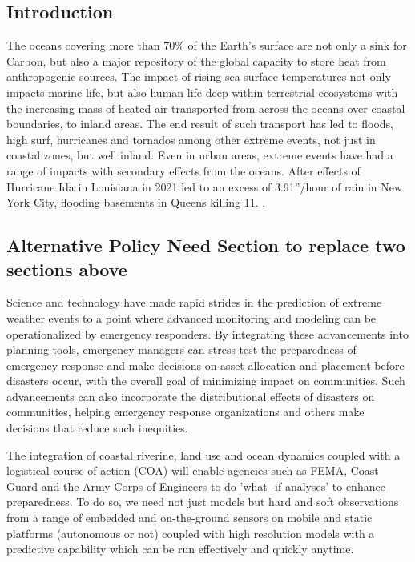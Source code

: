\subsection*{Introduction}

The oceans covering more than 70\% of the Earth's surface are not only
a sink for Carbon, but also a major repository of the global capacity
to store heat from anthropogenic sources. The impact of rising sea
surface temperatures not only impacts marine life, but also human life
deep within terrestrial ecosystems with the increasing mass of heated
air transported from across the oceans over coastal boundaries, to
inland areas. The end result of such transport has led to floods, high
surf, hurricanes and tornados among other extreme events, not just in
coastal zones, but well inland. Even in urban areas, extreme events
have had a range of impacts with secondary effects from the
oceans. After effects of Hurricane Ida in Louisiana in 2021 led to an
excess of 3.91''/hour of rain in New York City, flooding basements in
Queens killing 11. .

\subsection{Alternative Policy Need Section to replace two sections
  above}

Science and technology have made rapid strides in the prediction of
extreme weather events to a point where advanced monitoring and
modeling can be operationalized by emergency responders. By
integrating these advancements into planning tools, emergency managers
can stress-test the preparedness of emergency response and make
decisions on asset allocation and placement before disasters occur,
with the overall goal of minimizing impact on communities. Such
advancements can also incorporate the distributional effects of
disasters on communities, helping emergency response organizations and
others make decisions that reduce such inequities.


The integration of coastal riverine, land use and ocean dynamics
coupled with a logistical course of action (COA) will enable agencies
such as FEMA, Coast Guard and the Army Corps of Engineers to do ’what-
if-analyses’ to enhance preparedness. To do so, we need not just
models but hard and soft observations from a range of embedded and
on-the-ground sensors on mobile and static platforms (autonomous or
not) coupled with high resolution models with a predictive capability
which can be run effectively and quickly anytime.

